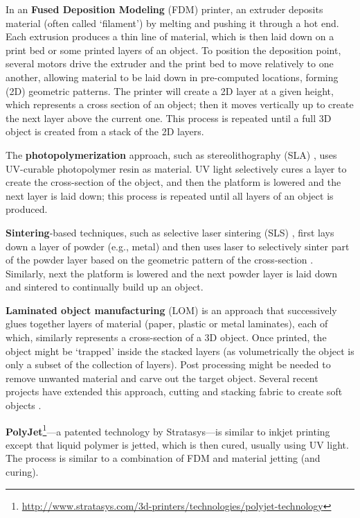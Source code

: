 In an \textbf{Fused Deposition Modeling} (FDM) printer, an extruder deposits material (often called `filament') by melting and pushing it through a hot end. Each extrusion produces a thin line of material, which is then laid down on a print bed or some printed layers of an object. To position the deposition point, several motors drive the extruder and the print bed to move relatively to one another, allowing material to be laid down in pre-computed locations, forming (2D) geometric patterns. The printer will create a 2D layer at a given height, which represents a cross section of an object; then it moves vertically up to create the next layer above the current one. This process is repeated until a full 3D object is created from a stack of the 2D layers.

The \textbf{photopolymerization} approach, such as stereolithography (SLA) \cite{wiki:Stereolithography}, uses UV-curable photopolymer resin as material. UV light selectively cures a layer to create the cross-section of the object, and then the platform is lowered and the next layer is laid down; this process is repeated until all layers of an object is produced.

\textbf{Sintering}-based techniques, such as selective laser sintering (SLS) \cite{wiki:sls}, first lays down a layer of powder (e.g., metal) and then uses laser to selectively sinter part of the powder layer based on the geometric pattern of the cross-section . Similarly, next the platform is lowered and the next powder layer is laid down and sintered to continually build up an object.

\textbf{Laminated object manufacturing} (LOM) \cite{wiki:Laminated_objectmanufacturing} is an approach that successively glues together layers of material (paper, plastic or metal laminates), each of which, similarly represents a cross-section of a 3D object. Once printed, the object might be `trapped' inside the stacked layers (as volumetrically the object is only a subset of the collection of layers). Post processing might be needed to remove unwanted material and carve out the target object. Several recent projects have extended this approach, cutting and stacking fabric to create soft objects \cite{hudson2014printing, peng2015layered}.

\textbf{PolyJet}\footnote{\url{http://www.stratasys.com/3d-printers/technologies/polyjet-technology}}---a patented technology by Stratasys---is similar to inkjet printing except that liquid polymer is jetted, which is then cured, usually using UV light. The process is similar to a combination of FDM and material jetting (and curing).


